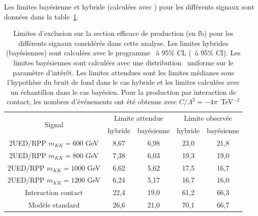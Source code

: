 Les limites bay\'esienne et hybride (calcul\'ees avec \opthylic) pour les diff\'erents signaux sont donn\'ees dans la table~\ref{tab:comparaisonLimitesHybrideBayesienne}. 
\vspace*{0.5cm}
\begin{table}[!htb]
  \begin{center}
    \begin{tabular}{|c|c|c|c|c|}
      \hline
      \multirow{2}{*}{Signal}                  &  \multicolumn{2}{c|}{Limite attendue}       &  \multicolumn{2}{c|}{Limite observ\'ee}     \\ \cline{2-5}
                                                                    &  hybride              & bay\'esienne           &   hybride     &   bay\'esienne             \\ \hline
      2UED/RPP $m_{KK}=600$ GeV   &   8,67        &    6,98                &      23,0        &    21,8                     \\ \hline
      2UED/RPP $m_{KK}=800$ GeV   &    7,38       &     6,03               &     19,3         &    19,0                     \\ \hline  
      2UED/RPP $m_{KK}=1000$ GeV  &   6,62        &     5,62              &   17,5           &    16,7                  \\ \hline  
      2UED/RPP $m_{KK}=1200$ GeV  &    6,24          &     5,17           &    16,7          &     16,0                    \\ \hline  
      Interaction contact                       &     22,4       &      19,0                             &      61,2         &    66,3                        \\ \hline  
      Mod\`ele standard                        &     26,6     &         21,0                     &         70,1      &     66,7                       \\ \hline  
    \end{tabular}
    \caption{Limites d'exclusion sur la section efficace de production (en fb) pour les diff\'erents signaux consid\'er\'es dans cette analyse. Les limites hybrides (bay\'esiennes) sont calcul\'ees avec le programme \opthylic~\`a 95\% CL (\tifosi~\`a 95\% CI). Les limites bay\'esiennes sont calcul\'ees avec une distribution \prior~uniforme sur le param\`etre d'int\'er\^et. Les limites attendues sont les limites m\'edianes sous l'hypoth\`ese du bruit de fond dans le cas hybride et les limites calcul\'ees avec un échantillon  dans le cas bay\'esien. Pour la production par interaction de contact, les nombres d'\'ev\'enements ont \'et\'e obtenus avec $C/\Lambda^2=-4\pi$~TeV$^{-2}$}\label{tab:comparaisonLimitesHybrideBayesienne}
  \end{center}
\end{table}
